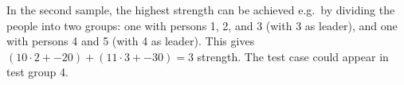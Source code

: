 In the second sample, the highest strength can be achieved e.g.\ by dividing the people into two groups:
one with persons 1, 2, and 3 (with 3 as leader), and one with persons 4 and 5 (with 4 as leader).
This gives $(10 \cdot 2 + -20) + (11 \cdot 3 + -30) = 3$ strength.
The test case could appear in test group 4.
